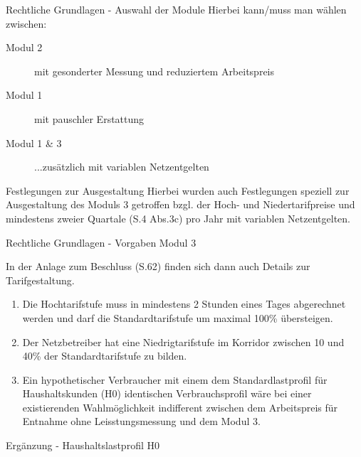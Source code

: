 \begin{frame}{Rechtliche Grundlagen - Auswahl der Module}
    Hierbei kann/muss man wählen zwischen:
    \begin{description}
        \item[Modul 2] mit gesonderter Messung und reduziertem Arbeitspreis
        \item[Modul 1] mit pauschler Erstattung
        \item[Modul 1 \& 3] ...zusätzlich mit variablen Netzentgelten
    \end{description} 
    \vspace{0.5cm}
    \begin{block}{Festlegungen zur Ausgestaltung}    
        Hierbei wurden auch Festlegungen speziell zur Ausgestaltung des Moduls 3 getroffen bzgl. der Hoch- und 
        Niedertarifpreise und mindestens zweier Quartale (S.4 Abs.3c) pro Jahr mit variablen Netzentgelten.
    \end{block}
\end{frame}

\begin{frame}{Rechtliche Grundlagen - Vorgaben Modul 3}
   
   In der Anlage zum Beschluss (S.62) finden sich dann auch Details zur Tarifgestaltung.

   \begin{enumerate}
      \item Die Hochtarifstufe muss in mindestens 2 Stunden eines Tages abgerechnet werden 
         und darf die Standardtarifstufe um maximal 100\% übersteigen.
      \item Der Netzbetreiber hat eine Niedrigtarifstufe im Korridor zwischen 10 und 40\% der 
         Standardtarifstufe zu bilden.
      \item Ein hypothetischer Verbraucher mit einem dem Standardlastprofil für 
         Haushaltskunden (H0) identischen Verbrauchsprofil wäre bei einer existierenden 
         Wahlmöglichkeit indifferent zwischen dem Arbeitspreis für Entnahme ohne 
         Leisstungsmessung und dem Modul 3.
   \end{enumerate}
\end{frame}

\begin{frame}{Ergänzung - Haushaltslastprofil H0}
    \centering
 \end{frame}

